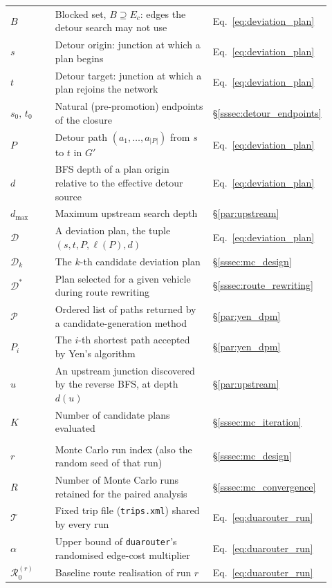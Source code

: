\begin{longtable}{@{}p{0.16\linewidth}>{\raggedright\arraybackslash}p{0.60\linewidth}p{0.16\linewidth}@{}}
$B$ & Blocked set, $B \supseteq E_c$: edges the detour search may not use & Eq.~\eqref{eq:deviation_plan} \\
$s$ & Detour origin: junction at which a plan begins & Eq.~\eqref{eq:deviation_plan} \\
$t$ & Detour target: junction at which a plan rejoins the network & Eq.~\eqref{eq:deviation_plan} \\
$s_0,\,t_0$ & Natural (pre-promotion) endpoints of the closure & \S\ref{sssec:detour_endpoints} \\
$P$ & Detour path $(a_1,\ldots,a_{|P|})$ from $s$ to $t$ in $G'$ & Eq.~\eqref{eq:deviation_plan} \\
$d$ & BFS depth of a plan origin relative to the effective detour source & Eq.~\eqref{eq:deviation_plan} \\
$d_{\max}$ & Maximum upstream search depth & \S\ref{par:upstream} \\
$\mathcal{D}$ & A deviation plan, the tuple $(s,t,P,\ell(P),d)$ & Eq.~\eqref{eq:deviation_plan} \\
$\mathcal{D}_k$ & The $k$-th candidate deviation plan & \S\ref{sssec:mc_design} \\
$\mathcal{D}^*$ & Plan selected for a given vehicle during route rewriting & \S\ref{sssec:route_rewriting} \\
$\mathcal{P}$ & Ordered list of paths returned by a candidate-generation method & \S\ref{par:yen_dpm} \\
$P_i$ & The $i$-th shortest path accepted by Yen's algorithm & \S\ref{par:yen_dpm} \\
$u$ & An upstream junction discovered by the reverse BFS, at depth $d(u)$ & \S\ref{par:upstream} \\
$K$ & Number of candidate plans evaluated & \S\ref{sssec:mc_iteration} \\
\addlinespace
\multicolumn{3}{@{}l}{\textbf{Monte Carlo simulation}}\\
\addlinespace
$r$ & Monte Carlo run index (also the random seed of that run) & \S\ref{sssec:mc_design} \\
$R$ & Number of Monte Carlo runs retained for the paired analysis & \S\ref{sssec:mc_convergence} \\
$\mathcal{T}$ & Fixed trip file (\texttt{trips.xml}) shared by every run & Eq.~\eqref{eq:duarouter_run} \\
$\alpha$ & Upper bound of \texttt{duarouter}'s randomised edge-cost multiplier & Eq.~\eqref{eq:duarouter_run} \\
$\mathcal{R}^{(r)}_0$ & Baseline route realisation of run $r$ & Eq.~\eqref{eq:duarouter_run} \\

\end{longtable}
